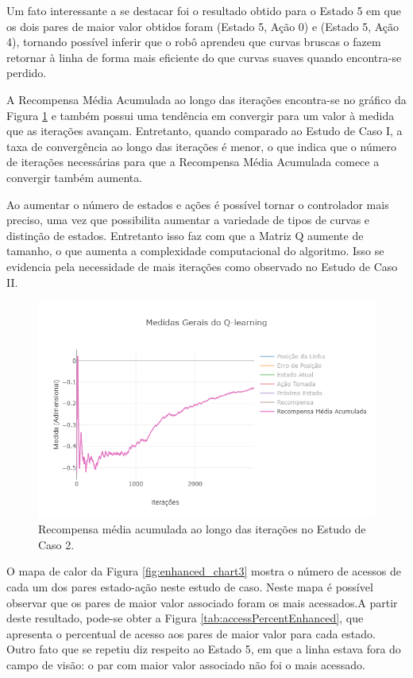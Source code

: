 \documentclass[a4paper]{ifacconf}
\begin{document}
Um fato interessante a se destacar foi o resultado obtido para o Estado 5 em que os dois pares de maior valor obtidos foram (Estado 5, Ação 0) e (Estado 5, Ação 4), tornando possível inferir que o robô aprendeu que curvas bruscas o fazem retornar à linha de forma mais eficiente do que curvas suaves quando encontra-se perdido. 

A Recompensa Média Acumulada ao longo das iterações encontra-se no gráfico da Figura \ref{fig:enhanced_chart2} e também possui uma tendência em convergir para um valor à medida que as iterações avançam. Entretanto, quando comparado ao Estudo de Caso I, a taxa de convergência ao longo das iterações é menor, o que indica que o número de iterações necessárias para que a Recompensa Média Acumulada comece a convergir também aumenta.

Ao aumentar o número de estados e ações é possível tornar o controlador mais preciso, uma vez que possibilita aumentar a variedade de tipos de curvas e distinção de estados. Entretanto isso faz com que a Matriz Q aumente de tamanho, o que aumenta a complexidade computacional do algoritmo. Isso se evidencia pela necessidade de mais iterações como observado no Estudo de Caso II.

\begin{figure}
\centering 
\includegraphics[scale=0.35]{Figuras/enhanced_chart2.png}
\caption{Recompensa média acumulada ao longo das iterações no Estudo de Caso 2.} \label{fig:enhanced_chart2}
\end{figure}

O mapa de calor da Figura \ref{fig:enhanced_chart3} mostra o número de acessos de cada um dos pares estado-ação neste estudo de caso. Neste mapa é possível observar que os pares de maior valor associado foram os mais acessados.A partir deste resultado, pode-se obter a Figura \ref{tab:accessPercentEnhanced}, que apresenta o percentual de acesso aos pares de maior valor para cada estado. Outro fato que se repetiu diz respeito ao Estado 5, em que a linha estava fora do campo de visão: o par com maior valor associado não foi o mais acessado.
\end{document}
